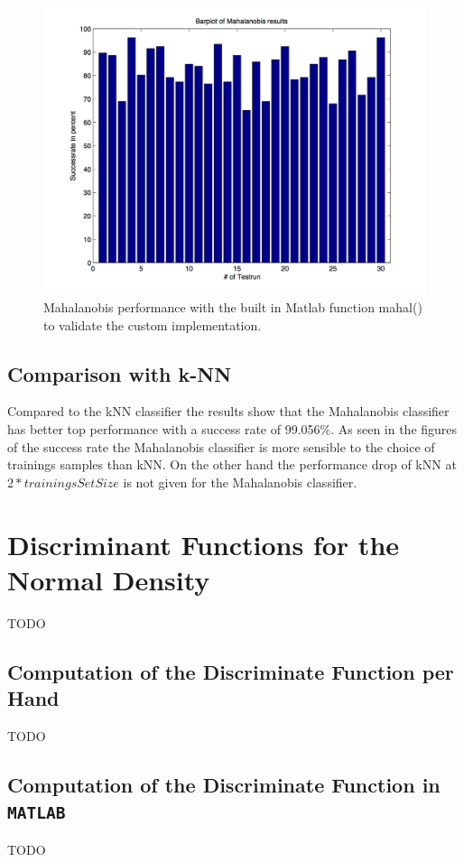 \documentclass[subfigure,epsfig,fleqn,amssmb,float,caption,ausarbeitung]{scrartcl}
\begin{document}
\begin{figure}
	\centering
	\includegraphics[scale=0.75]{img/mahalanobis_results_matlab_covmat.jpg}
	\caption{Mahalanobis performance with the built in Matlab function mahal() to validate the custom implementation.}
\end{figure}

\subsection{Comparison with k-NN}
\label{sec:MahalanobisComparison}

Compared to the kNN classifier the results show that the Mahalanobis classifier has better top performance with a success rate of 99.056\%. As seen in the figures of the success rate the Mahalanobis classifier is more sensible to the choice of trainings samples than kNN. On the other hand the performance drop of kNN at $2*trainingsSetSize$ is not given for the Mahalanobis classifier. 


\section{Discriminant Functions for the Normal Density}
\label{sec:DiscriminantFunctions}

TODO


\subsection{Computation of the Discriminate Function per Hand}
\label{sec:Hand}

TODO


\subsection{Computation of the Discriminate Function in \texttt{MATLAB}}
\label{sec:Matlab}

TODO


\pagebreak


\fontsize{9}{10pt}


\end{document}
